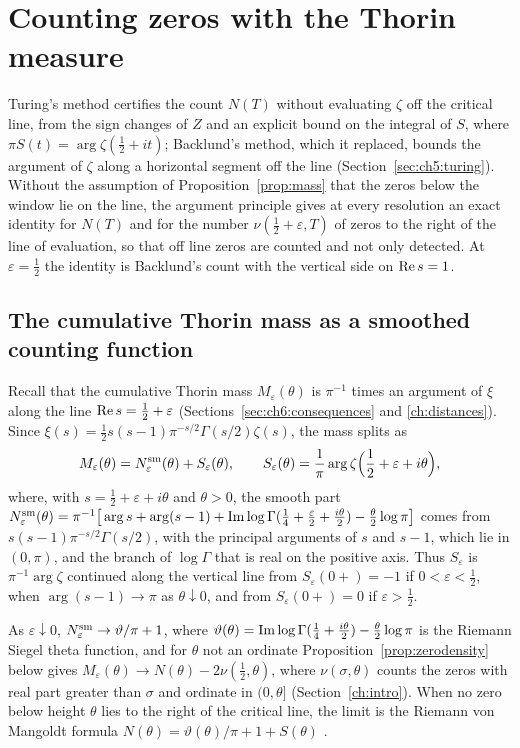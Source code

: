 \section{Counting zeros with the Thorin measure}\label{ch:turing}
\label{sec:turing}

Turing's method certifies the count $N(T)$ without evaluating $\zeta$ off the critical line, from the sign changes of $Z$ and an explicit bound on the integral of $S$, where $\pi S(t)=\arg\zeta(\tfrac12+it)$; Backlund's method, which it replaced, bounds the argument of $\zeta$ along a horizontal segment off the line (Section~\ref{sec:ch5:turing}). Without the assumption of Proposition~\ref{prop:mass} that the zeros below the window lie on the line, the argument principle gives at every resolution an exact identity for $N(T)$ and for the number $\nu(\tfrac12+\varepsilon,T)$ of zeros to the right of the line of evaluation, so that off line zeros are counted and not only detected. At $\varepsilon=\tfrac12$ the identity is Backlund's count with the vertical side on $\operatorname{Re} s=1$.

\subsection{The cumulative Thorin mass as a smoothed counting function}\label{sec:ch9:mass}

Recall that the cumulative Thorin mass $M_\varepsilon(\theta)$ is $\pi^{-1}$ times an argument of $\xi$ along the line $\operatorname{Re} s=\tfrac12+\varepsilon$ (Sections~\ref{sec:ch6:consequences} and \ref{ch:distances}). Since $\xi(s)=\tfrac12s(s-1)\pi^{-s/2}\Gamma(s/2)\zeta(s)$, the mass splits as
\[
M_\varepsilon(\theta)=N^{\rm sm}_\varepsilon(\theta)+S_\varepsilon(\theta),\qquad S_\varepsilon(\theta)=\frac1\pi\arg\zeta\Big(\frac12+\varepsilon+i\theta\Big),
\]
where, with $s=\tfrac12+\varepsilon+i\theta$ and $\theta>0$, the smooth part $N^{\rm sm}_\varepsilon(\theta)=\pi^{-1}\big[\arg s+\arg(s-1)+\operatorname{Im}\log\Gamma(\tfrac14+\tfrac\varepsilon2+\tfrac{i\theta}2)-\tfrac\theta2\log\pi\big]$ comes from $s(s-1)\pi^{-s/2}\Gamma(s/2)$, with the principal arguments of $s$ and $s-1$, which lie in $(0,\pi)$, and the branch of $\log\Gamma$ that is real on the positive axis. Thus $S_\varepsilon$ is $\pi^{-1}\arg\zeta$ continued along the vertical line from $S_\varepsilon(0+)=-1$ if $0<\varepsilon<\tfrac12$, when $\arg(s-1)\to\pi$ as $\theta\downarrow0$, and from $S_\varepsilon(0+)=0$ if $\varepsilon>\tfrac12$.

As $\varepsilon\downarrow0$, $N^{\rm sm}_\varepsilon\to\vartheta/\pi+1$, where $\vartheta(\theta)=\operatorname{Im}\log\Gamma(\tfrac14+\tfrac{i\theta}2)-\tfrac\theta2\log\pi$ is the Riemann Siegel theta function, and for $\theta$ not an ordinate Proposition~\ref{prop:zerodensity} below gives $M_\varepsilon(\theta)\to N(\theta)-2\nu(\tfrac12,\theta)$, where $\nu(\sigma,\theta)$ counts the zeros with real part greater than $\sigma$ and ordinate in $(0,\theta]$ (Section~\ref{ch:intro}). When no zero below height $\theta$ lies to the right of the critical line, the limit is the Riemann von Mangoldt formula $N(\theta)=\vartheta(\theta)/\pi+1+S(\theta)$ \cite[Section 9.3]{Titchmarsh}.


